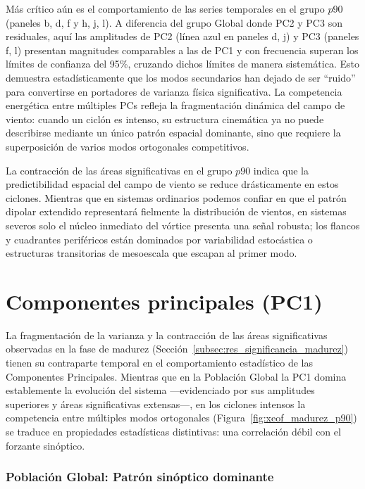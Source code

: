 Más crítico aún es el comportamiento de las series temporales en el grupo $p90$ (paneles b, d, f y h, j, l). A diferencia del grupo Global donde PC2 y PC3 son residuales, aquí las amplitudes de PC2 (línea azul en paneles d, j) y PC3 (paneles f, l) presentan magnitudes comparables a las de PC1 y con frecuencia superan los límites de confianza del 95\%, cruzando dichos límites de manera sistemática. 
Esto demuestra estadísticamente que los modos secundarios han dejado de ser ``ruido'' para convertirse en portadores de varianza física significativa. 
La competencia energética entre múltiples PCs refleja la fragmentación dinámica del campo de viento: cuando un ciclón es intenso, su estructura cinemática ya no puede describirse mediante un único patrón espacial dominante, sino que requiere la superposición de varios modos ortogonales competitivos.

La contracción de las áreas significativas en el grupo $p90$ indica que la predictibilidad espacial del campo de viento se reduce drásticamente en estos ciclones. 
Mientras que en sistemas ordinarios podemos confiar en que el patrón dipolar extendido representará fielmente la distribución de vientos, en sistemas severos solo el núcleo inmediato del vórtice presenta una señal robusta; los flancos y cuadrantes periféricos están dominados por variabilidad estocástica o estructuras transitorias de mesoescala que escapan al primer modo. 

\section{Componentes principales (PC1)}\label{subsec:res_dinamica_pc1}

La fragmentación de la varianza y la contracción de las áreas significativas observadas en la fase de madurez (Sección~\ref{subsec:res_significancia_madurez}) tienen su contraparte temporal en el comportamiento estadístico de las Componentes Principales. 
Mientras que en la Población Global la PC1 domina establemente la evolución del sistema ---evidenciado por sus amplitudes superiores y áreas significativas extensas---, en los ciclones intensos la competencia entre múltiples modos ortogonales (Figura~\ref{fig:xeof_madurez_p90}) se traduce en propiedades estadísticas distintivas: una correlación débil con el forzante sinóptico.



\subsubsection{Población Global: Patrón sinóptico dominante}

